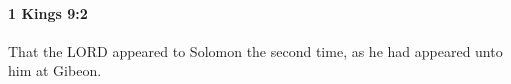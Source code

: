 
		\paragraph{1 Kings 9:2} %
			\label{1KINGS-9-2}

			That the LORD appeared to Solomon the second time, as he had appeared unto him at Gibeon.


